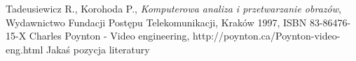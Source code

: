 \documentclass[twoside]{projektInzynierskiMS}
\begin{document}
\begin{thebibliography}{12}

 Tadeusiewicz R., Korohoda P., \emph{Komputerowa analiza i przetwarzanie obrazów}, Wydawnictwo Fundacji Postępu Telekomunikacji, Kraków 1997, ISBN 83-86476-15-X
 Charles Poynton - Video engineering, http://poynton.ca/Poynton-video-eng.html
 Jakaś pozycja literatury

\end{thebibliography}
\end{document}
